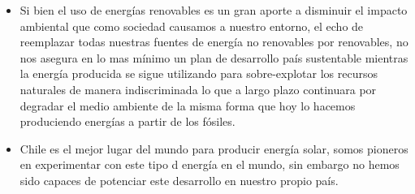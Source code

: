 \begin{itemize}
\item Si bien el uso de energías renovables es un gran aporte a disminuir el impacto ambiental que como sociedad causamos a nuestro entorno, el echo de reemplazar todas nuestras fuentes de energía no renovables por renovables, no nos asegura en lo mas mínimo un plan de desarrollo país sustentable mientras la energía producida se sigue utilizando para sobre-explotar los recursos naturales de manera indiscriminada lo que a largo plazo continuara por degradar el medio ambiente de la misma forma que hoy lo hacemos produciendo energías a partir de los fósiles.
\item Chile es el mejor lugar del mundo para producir energía solar, somos pioneros en experimentar con este tipo d energía en el mundo, sin embargo no hemos sido capaces de potenciar este desarrollo en nuestro propio país.
\end{itemize}
